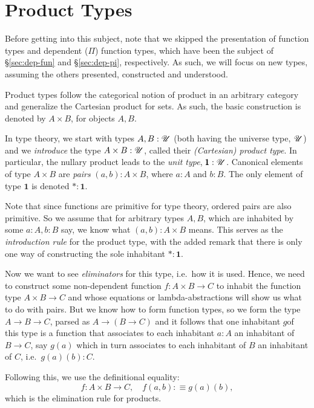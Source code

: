 \section{Product Types}

Before getting into this subject, note that we skipped the presentation of
function types and dependent ($\Pi$) function types, which have been the subject
of \S\ref{sec:dep-fun} and \S\ref{sec:dep-pi}, respectively. As such, we will
focus on new types, assuming the others presented, constructed and understood.

Product types follow the categorical notion of product in an arbitrary
category and generalize the Cartesian product for sets. As such, the basic
construction is denoted by $ A \times B $, for objects $ A, B $.

In type theory, we start with types $ A, B : \mathscr{U} $ (both having the
universe type, $ \mathscr{U} $) and we \emph{introduce} the type
$ A \times B : \mathscr{U} $, called their \emph{(Cartesian) product type}.
In particular, the nullary product leads to the \emph{unit type},
$ \pmb{1} : \mathscr{U} $. Canonical elements of type $ A \times B $
are \emph{pairs} $ (a, b) : A \times B $, where $ a : A $ and $ b : B $.
The only element of type $ \pmb{1} $ is denoted $ \ast : \pmb{1} $.

Note that since functions are primitive for type theory, ordered pairs
are also primitive. So we assume that for arbitrary types $ A, B $,
which are inhabited by some $ a : A, b : B $ say, we know what
$ (a, b) : A \times B $ means. This serves as the \emph{introduction rule}
for the product type, with the added remark that there is only one way
of constructing the sole inhabitant  $ \ast :  \pmb{1} $.

Now we want to see \emph{eliminators} for this type, i.e.\ how it is used.
Hence, we need to construct some non-dependent function $ f : A \times B \to C $
to inhabit the function type $ A \times B \to C $ and whose equations or
lambda-abstractions will show us what to do with pairs. But we know how to
form function types, so we form the type $ A \to B \to C $, parsed as
$ A \to (B \to C) $ and it follows that one inhabitant $ g $of this type is a
function that associates to each inhabitant $ a : A $ an inhabitant of
$ B \to C $, say $ g(a) $ which in turn associates to each inhabitant of $ B $ an
inhabitant of $ C $, i.e.\ $ g(a)(b) : C $.

Following this, we use the definitional equality:
\[
  f: A \times B \to C, \quad f(a, b) :\equiv g(a)(b),
\]
which is the elimination rule for products.

